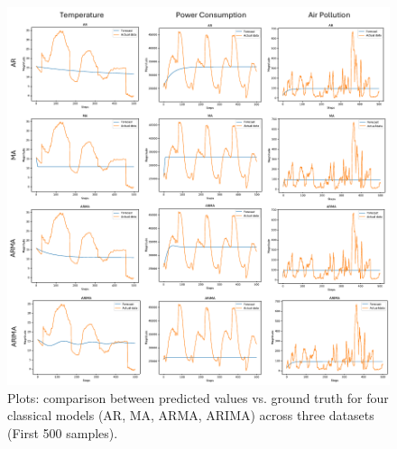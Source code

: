 \documentclass[sn-mathphys-num]{sn-jnl}
\theoremstyle{thmstyleone}%
\theoremstyle{thmstyletwo}%
\theoremstyle{thmstylethree}%
\begin{document}
\begin{figure}[]
	\begin{center}
		\includegraphics[scale=0.8]{classical.pdf}
	\end{center}
	\caption{Plots: comparison between predicted values vs. ground truth for four classical models (AR, MA, ARMA, ARIMA) across three datasets (First 500 samples).}
	\label{fig:classical_perf}
\end{figure}
\end{document}
